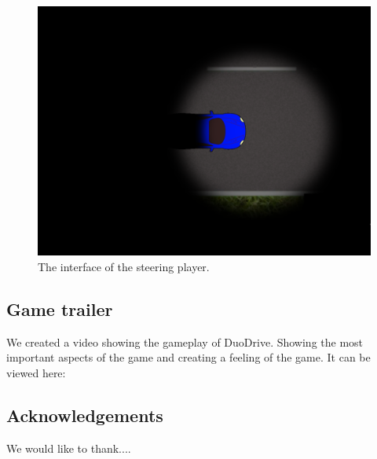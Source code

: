\documentclass{sigchi}
\begin{document}
\begin{figure}[!h]
\centering
\includegraphics[width=0.9\columnwidth]{Figure1}
\caption{The interface of the steering player.}
\label{fig:figure1}
\end{figure}

\subsection{Game trailer}

We created a video showing the gameplay of DuoDrive.
Showing the most important aspects of the game and creating
a feeling of the game. It can be viewed here:

\subsection{Acknowledgements}

We would like to thank....


\end{document}
